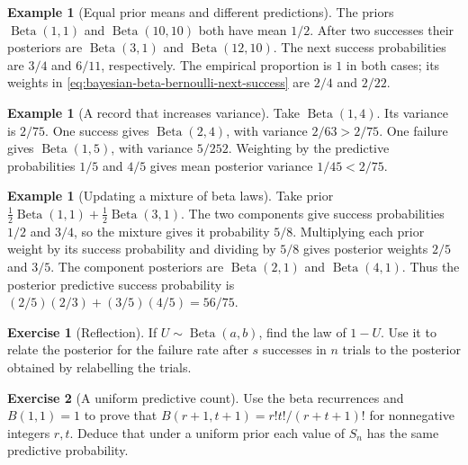 \documentclass[11pt,oneside]{book}
\theoremstyle{definition}
\newtheorem{example}[theorem]{Example}
\newtheorem{exercise}{Exercise}[section]
\theoremstyle{remark}
\begin{document}
\begin{example}[Equal prior means and different predictions]
\label{ex:bayesian-beta-prior-weight}
The priors $\operatorname{Beta}(1,1)$ and $\operatorname{Beta}(10,10)$
both have mean $1/2$. After two successes their posteriors are
$\operatorname{Beta}(3,1)$ and $\operatorname{Beta}(12,10)$.
The next success probabilities are $3/4$ and $6/11$, respectively.
The empirical proportion is $1$ in both cases; its weights in
\eqref{eq:bayesian-beta-bernoulli-next-success} are $2/4$ and $2/22$.
\end{example}

\begin{example}[A record that increases variance]
\label{ex:bayesian-beta-variance-increase}
Take $\operatorname{Beta}(1,4)$. Its variance is $2/75$.
One success gives $\operatorname{Beta}(2,4)$, with variance
$2/63>2/75$. One failure gives $\operatorname{Beta}(1,5)$,
with variance $5/252$. Weighting by the predictive probabilities
$1/5$ and $4/5$ gives mean posterior variance $1/45<2/75$.
\end{example}

\begin{example}[Updating a mixture of beta laws]
\label{ex:bayesian-beta-mixture}
Take prior $\tfrac12\operatorname{Beta}(1,1)+
\tfrac12\operatorname{Beta}(3,1)$. The two components give success
probabilities $1/2$ and $3/4$, so the mixture gives it probability
$5/8$. Multiplying each prior weight by its success probability
and dividing by $5/8$ gives posterior weights $2/5$ and $3/5$.
The component posteriors are $\operatorname{Beta}(2,1)$ and
$\operatorname{Beta}(4,1)$. Thus the posterior predictive success
probability is $(2/5)(2/3)+(3/5)(4/5)=56/75$.
\end{example}

\begin{exercise}[Reflection]
\label{exer:bayesian-beta-reflection}
If $U\sim\operatorname{Beta}(a,b)$, find the law of $1-U$.
Use it to relate the posterior for the failure rate after $s$
successes in $n$ trials to the posterior obtained by relabelling
the trials.
\end{exercise}

\begin{exercise}[A uniform predictive count]
\label{exer:bayesian-beta-uniform-count}
Use the beta recurrences and $B(1,1)=1$ to prove that
$B(r+1,t+1)=r!t!/(r+t+1)!$ for nonnegative integers $r,t$.
Deduce that under a uniform prior each value of $S_n$ has the
same predictive probability.
\end{exercise}
\end{document}

